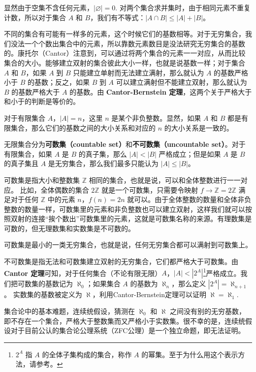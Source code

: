 

显然由于空集不含任何元素，$|\varnothing|=0$. 对两个集合求并集时，由于相同元素不重复计数，所以对于集合 $A$ 和 $B$，我们有不等式：$|A\cap B|\leqslant|A|+|B|$。

不同的集合有可能有一样多的元素，这个时候它们的基数相等。对于无穷集合，我们没法一个个数出集合中的元素，所以靠数元素数目是没法研究无穷集合的基数的。康托尔（Cantor）注意到，可以通过将两个集合的元素一一对应，从而比较集合的大小。能够建立双射的集合彼此大小一样，也就是说基数一样；对于集合 $A$ 和 $B$，如果 $A$ 到 $B$ 只能建立单射而无法建立满射，那么就认为 $A$ 的基数严格小于 $B$ 的基数；反之，如果 $B$ 到 $A$ 可以建立满射但不能建立双射，那么就认为 $B$ 的基数严格大于 $A$ 的基数。由 \textbf{Cantor-Bernstein 定理}，这两个关于严格大于和小于的判断是等价的。

对于有限集合 $A$，$|A|=n$，这里 $n$ 是某个非负整数。显然，如果 $A$ 和 $B$ 都是有限集合，那么它们的基数之间的大小关系和对应的 $n$ 的大小关系是一致的。

无限集合分为\textbf{可数集（countable set）}和\textbf{不可数集（uncountable set）}。对于有限集合，如果 $A$ 是 $B$ 的真子集，那么 $|A|<|B|$ 严格成立；但是如果 $A$ 是 $B$ 的真子集且 $A$ 是无穷集合，那么我们最多只能认为 $|A|\leqslant|B|$。

可数集是指大小和整数集 $\mathbb{Z}$ 相同的集合，也就是说，可以和全体整数进行一一对应。 比如，全体偶数的集合 $2\mathbb{Z}$ 就是一个可数集，只需要令映射 $f\rightarrow \mathbb{Z}=2\mathbb{Z}$ 满足对于任何 $\mathbb{Z}$ 中的元素 $n$，$f(n)=2n$ 就可以。由于全体整数的数量和全体非负整数的数量一样，可数集里的元素和非负整数也可以建立双射，这样我们就可以按照双射的连接“挨个数出”可数集里的元素，这就是可数集名称的来源。有理数集是可数的，但无理数集和实数集是不可数的。

可数集是最小的一类无穷集合，也就是说，任何无穷集合都可以满射到可数集上。

不可数集是指无法和可数集建立双射的无穷集合，它们都严格大于可数集。由 \textbf{Cantor 定理}可知，对于任何集合（不论有限无限）$A$，$|A|<|2^A|$\footnote{$2^A$ 指 $A$ 的全体子集构成的集合，称作 $A$ 的幂集。至于为什么用这个表示方法，请参考。}严格成立。我们把可数集的基数记为 $\aleph_0$；如果集合 $A$ 的基数为 $\aleph_n$，那么定义 $|2^A|=\aleph_{n+1}$。 实数集的基数被定义为 $\aleph$，利用Cantor-Bernstein定理可以证明 $\aleph=\aleph_1$. 

集合论中的基本难题，连续统假设，猜测在 $\aleph_0$ 和 $\aleph$ 之间没有别的无穷基数，即不存在一个集合，严格大于整数集而又严格小于实数集。很不幸的是，连续统假设对于目前公认的集合论公理系统（ZFC公理）是一个独立命题，即无法证明。


